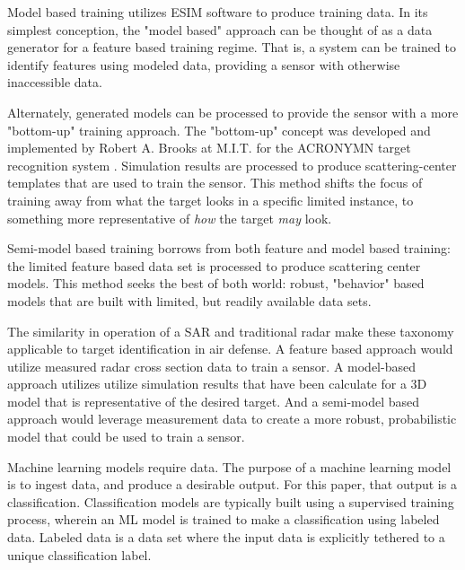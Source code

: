 Model based training utilizes ESIM software to produce training data. In its simplest conception, the "model based" approach can be thought of as a data generator for a feature based training regime. That is, a system can be trained to identify features using modeled data, providing a sensor with otherwise inaccessible data.

 Alternately, generated models can be processed to provide the sensor with a more "bottom-up" training approach. The "bottom-up" concept was developed and implemented by Robert A. Brooks at M.I.T. for the ACRONYMN target recognition system \cite{Brooks}\cite{Brooks2}. Simulation results are processed to produce scattering-center templates that are used to train the sensor. This method shifts the focus of training away from what the target looks in a specific limited instance, to something more representative of \textit{how} the target \textit{may} look.

Semi-model based training borrows from both feature and model based training: the limited feature based data set is processed to produce scattering center models. This method seeks the best of both world:  robust, "behavior" based models that are built with limited, but readily available data sets. 

The similarity in operation of a SAR and traditional radar make these taxonomy applicable to target identification in air defense. A feature based approach would utilize measured radar cross section data to train a sensor. A model-based approach utilizes utilize simulation results that have been calculate for a 3D model that is representative of the desired target. And a semi-model based approach would leverage measurement data to create a more robust, probabilistic model that could be used to train a sensor.

Machine learning models require data. The purpose of a machine learning model is to ingest data, and produce a desirable output. For this paper, that output is a classification. Classification models are typically built using a supervised training process, wherein an ML model is trained to make a classification using labeled data. Labeled data is a data set where the input data is explicitly tethered to a unique classification label.






